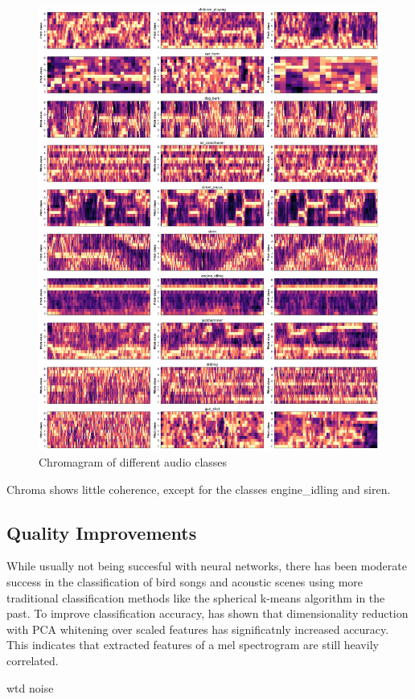 \begin{figure}[H]
    \centering
	\includegraphics[width=.9\textwidth]{./images/features/chroma}
    \caption{Chromagram of different audio classes}
    \label{fig:chroma}
\end{figure}


Chroma shows little coherence, except for the classes engine_idling and siren.


\subsection{Quality Improvements}
While usually not being succesful with neural networks, there has been moderate success in the classification of bird songs and acoustic scenes using more traditional classification methods like the spherical k-means algorithm in the past. To improve classification accuracy, \cite{Coates2012} has shown that dimensionality reduction with PCA whitening over scaled features has significatnly increased accuracy. 
This indicates that extracted features of a mel spectrogram are still heavily correlated.

wtd noise

